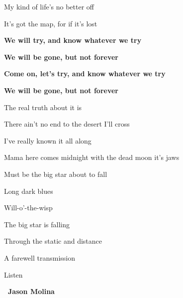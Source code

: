 \documentclass[10pt,twoside]{article}
\newcommand{\songtext}{\raggedright\fontsize{9bp}{9.15bp}\selectfont}
\newenvironment{songcolumns}
  {\begin{multicols*}{2}\songtext}
  {\end{multicols*}}
\newcommand{\lyric}[1]{%
  \hangindent=9bp\relax
  #1\par
}
\newenvironment{stanza}{\par\begingroup}{\par\endgroup\addvspace{4bp}}
\newcommand{\refrain}[1]{\lyric{\textbf{#1}}}
\newcommand{\chords}[1]{%
  \par\nobreak\vskip 2bp
  {\chordface\fontsize{10bp}{11bp}\selectfont\formatchords{#1}\par}%
  \addvspace{4bp}%
}
\newcommand{\songcredit}[1]{%
  \par\nobreak\noindent\hspace*{9bp}%
  {\sffamily\bfseries\fontsize{7bp}{8bp}\selectfont\textemdash\ #1\par}%
}
\begin{document}
\begin{songcolumns}
\begin{stanza}
  \lyric{My kind of life's no better off}
  \lyric{It's got the map, for if it's lost}
\end{stanza}
\begin{stanza}
  \refrain{We will try, and know whatever we try}
  \refrain{We will be gone, but not forever}
  \refrain{Come on, let's try, and know whatever we try}
  \refrain{We will be gone, but not forever}
\end{stanza}
\begin{stanza}
  \lyric{The real truth about it is}
  \lyric{There ain't no end to the desert I'll cross}
  \lyric{I've really known it all along}
  \chords{C\# - C\#m - / B - E -}
\end{stanza}
\begin{stanza}
  \lyric{Mama here comes midnight with the dead moon it's jaws}
  \chords{C\# - C\#m - / B - - -}
\end{stanza}
\begin{stanza}
  \lyric{Must be the big star about to fall}
  \chords{C\# - C\#m - / G\#m - - -}
\end{stanza}
\begin{stanza}
  \lyric{Long dark blues}
  \lyric{Will-o'-the-wisp}
  \lyric{The big star is falling}
  \lyric{Through the static and distance}
  \lyric{A farewell transmission}
  \lyric{Listen}
\end{stanza}
\songcredit{Jason Molina}

\columnbreak


\end{songcolumns}
\end{document}
